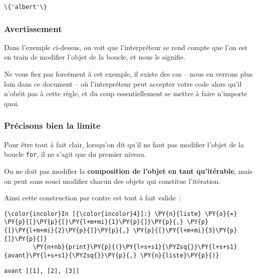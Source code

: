     \begin{Verbatim}[commandchars=\\\{\}]
\{'albert'\}

    \end{Verbatim}

    \hypertarget{avertissement}{%
\subsubsection{Avertissement}\label{avertissement}}

    Dans l'exemple ci-dessus, on voit que l'interpréteur se rend compte que
l'on est en train de modifier l'objet de la boucle, et nous le signifie.

Ne vous fiez pas forcément à cet exemple, il existe des cas -- nous en
verrons plus loin dans ce document -- où l'interpréteur peut accepter
votre code alors qu'il n'obéit pas à cette règle, et du coup
essentiellement se mettre à faire n'importe quoi.

    \hypertarget{pruxe9cisons-bien-la-limite}{%
\subsubsection{Précisons bien la
limite}\label{pruxe9cisons-bien-la-limite}}

    Pour être tout à fait clair, lorsqu'on dit qu'il ne faut pas modifier
l'objet de la boucle \texttt{for}, il ne s'agit que du premier niveau.

On ne doit pas modifier la \textbf{composition de l'objet en tant
qu'itérable}, mais on peut sans souci modifier chacun des objets qui
constitue l'itération.

Ainsi cette construction par contre est tout à fait valide~:

    \begin{Verbatim}[commandchars=\\\{\}]
{\color{incolor}In [{\color{incolor}4}]:} \PY{n}{liste} \PY{o}{=} \PY{p}{[}\PY{p}{[}\PY{l+m+mi}{1}\PY{p}{]}\PY{p}{,} \PY{p}{[}\PY{l+m+mi}{2}\PY{p}{]}\PY{p}{,} \PY{p}{[}\PY{l+m+mi}{3}\PY{p}{]}\PY{p}{]}
        \PY{n+nb}{print}\PY{p}{(}\PY{l+s+s1}{\PYZsq{}}\PY{l+s+s1}{avant}\PY{l+s+s1}{\PYZsq{}}\PY{p}{,} \PY{n}{liste}\PY{p}{)}
\end{Verbatim}


    \begin{Verbatim}[commandchars=\\\{\}]
avant [[1], [2], [3]]

    \end{Verbatim}

